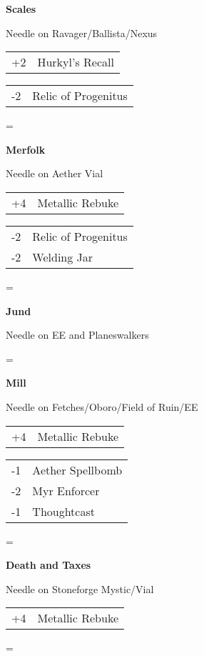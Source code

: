 \documentclass[fontsize=12pt,paper=a4]{scrartcl}
\newenvironment{absolutelynopagebreak}
  {\par\nobreak\vfil\penalty0\vfilneg
   \vtop\bgroup}
  {\par\xdef\tpd{\the\prevdepth}\egroup
   \prevdepth=\tpd}
\newenvironment{decklist}{%
    \begin{tabular}{>{\hspace{-4pt}}r<{\hspace{-3pt}}>{\hspace{-3pt}}l<{\hspace{-4pt}}}
    }{%
    \end{tabular}
    \par
}
\newcommand{\card}[2]{#1 & #2\\}
\newenvironment{sideboardguide}{%
    \newpage
    \begin{multicols}{4}
        \begin{tiny}
        }{%
        \end{tiny}
    \end{multicols}
}
\newenvironment{matchup}[1]{%
    \begin{absolutelynopagebreak}
        \textbf{#1}\par
    }{%
    \end{absolutelynopagebreak}
    \par\vspace{2em}
}
\newenvironment{notes}{%
}{%
    \par
}
\begin{document}
\begin{sideboardguide}
\begin{matchup}{Scales}
        \begin{notes}
            Needle on Ravager/Ballista/Nexus
        \end{notes}
        \begin{decklist}
            \card{+2}{Hurkyl's Recall}
        \end{decklist}
        \begin{decklist}
            \card{-2}{Relic of Progenitus}
        \end{decklist}
    \end{matchup}
    \begin{matchup}{Merfolk}
        \begin{notes}
            Needle on Aether Vial
        \end{notes}
        \begin{decklist}
            \card{+4}{Metallic Rebuke}
        \end{decklist}
        \begin{decklist}
            \card{-2}{Relic of Progenitus}
            \card{-2}{Welding Jar}
        \end{decklist}
    \end{matchup}
    \begin{matchup}{Jund}
        \begin{notes}
            Needle on EE and Planeswalkers
        \end{notes}
    \end{matchup}
    \begin{matchup}{Mill}
        \begin{notes}
            Needle on Fetches/Oboro/Field of Ruin/EE
        \end{notes}
        \begin{decklist}
            \card{+4}{Metallic Rebuke}
        \end{decklist}
        \begin{decklist}
            \card{-1}{Aether Spellbomb}
            \card{-2}{Myr Enforcer}
            \card{-1}{Thoughtcast}
        \end{decklist}
    \end{matchup}
    \begin{matchup}{Death and Taxes}
        \begin{notes}
            Needle on Stoneforge Mystic/Vial
        \end{notes}
        \begin{decklist}
            \card{+4}{Metallic Rebuke}
        \end{decklist}

\end{matchup}
\end{sideboardguide}
\end{document}
